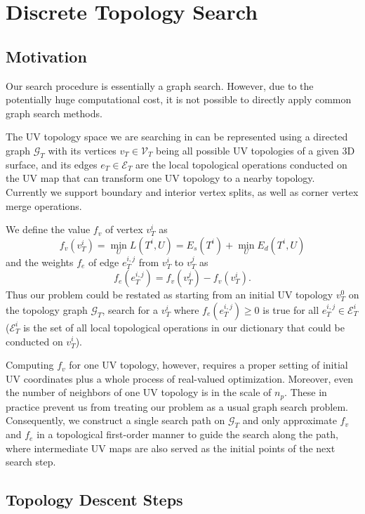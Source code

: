 
\section{Discrete Topology Search}
\label{sec:topologyStep}

\subsection{Motivation}
\label{sec:topologySearch}

Our search procedure is essentially a graph search. However, due to the potentially huge computational cost, it is not possible to directly apply common graph search methods.

The UV topology space we are searching in can be represented using a directed graph $\mathcal{G}_T$ with its vertices $v_T \in \mathcal{V}_T$ being all possible UV topologies of a given 3D surface, and its edges $e_T \in \mathcal{E}_T$ are the local topological operations conducted on the UV map that can transform one UV topology to a nearby topology. Currently we support boundary and interior vertex splits, as well as corner vertex merge operations.  

We define the value $f_v$ of vertex $v^i_T$ as 
\[ f_v(v^i_T) = \min_{U} L(T^i, U) = E_s(T^i) + \min_{U} E_d(T^i, U) \]
and the weights $f_e$ of edge $e^{i,j}_{T}$ from $v^i_T$ to $v^j_T$ as 
\[ f_e(e^{i,j}_T) = f_v(v^j_T) - f_v(v^i_T). \]
Thus our problem could be restated as starting from an initial UV topology $v^0_T$ on the topology graph $\mathcal{G}_T$, search for a $v^i_T$ where $f_e(e^{i,j}_T) \geq 0$ is true for all $e^{i,j}_T \in \mathcal{E}^i_T$ ($\mathcal{E}^i_T$ is the set of all local topological operations in our dictionary that could be conducted on $v^i_T$).

Computing $f_v$ for one UV topology, however, requires a proper setting of initial UV coordinates plus a whole process of real-valued optimization. Moreover, even the number of neighbors of one UV topology is in the scale of $n_p$. These in practice prevent us from treating our problem as a usual graph search problem. Consequently, we construct a single search path on $\mathcal{G}_T$ and only approximate $f_v$ and $f_e$ in a topological first-order manner to guide the search along the path, where intermediate UV maps are also served as the initial points of the next search step.

\subsection{Topology Descent Steps}

